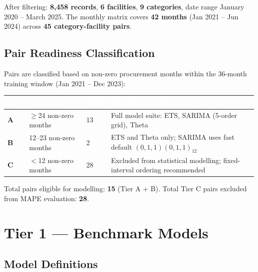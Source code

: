 \documentclass[12pt, a4paper]{article}
\begin{document}
After filtering: \textbf{8,458 records}, \textbf{6 facilities},
\textbf{9 categories}, date range January 2020 -- March 2025.
The monthly matrix covers \textbf{42 months} (Jan 2021 -- Jun 2024)
across \textbf{45 category-facility pairs}.

\subsection{Pair Readiness Classification}

Pairs are classified based on non-zero procurement months within the
36-month training window (Jan 2021 -- Dec 2023):

\vspace{0.5em}
\noindent
\begin{tabularx}{\textwidth}{@{} C{1.6cm} L{3.2cm} R{1.8cm} X @{}}
  \toprule
  \textcolor{white}{\textbf{Tier}} &
  \textcolor{white}{\textbf{Criterion}} &
  \textcolor{white}{\textbf{Pairs}} &
  \textcolor{white}{\textbf{Modelling treatment}} \\
  \midrule
  \textbf{A} & $\geq$24 non-zero months & 13 &
    Full model suite: ETS, SARIMA (5-order grid), Theta \\
  \textbf{B} & 12--23 non-zero months & 2 &
    ETS and Theta only; SARIMA uses fast default
    $(0,1,1)(0,1,1)_{12}$ \\
  \textbf{C} & $<$12 non-zero months & 28 &
    Excluded from statistical modelling;
    fixed-interval ordering recommended \\
  \bottomrule
\end{tabularx}

\vspace{0.5em}
Total pairs eligible for modelling: \textbf{15} (Tier A + B).
Total Tier C pairs excluded from MAPE evaluation: \textbf{28}.

\section{Tier 1 --- Benchmark Models}

\subsection{Model Definitions}
\end{document}
